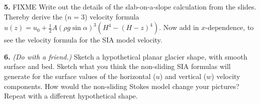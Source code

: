 \documentclass[12pt]{amsart}
\newcommand{\prob}[1]{\bigskip\noindent\textbf{#1.}\quad }
\begin{document}
\prob{5}  FIXME Write out the details of the slab-on-a-slope calculation from the slides.  Thereby derive the ($n=3$) velocity formula $u(z) = u_0 + \frac{1}{2} A (\rho g \sin\alpha)^3  \left(H^4 - (H-z)^4\right)$.  Now add in $x$-dependence, to see the velocity formula for the SIA model velocity.

\prob{6}  \emph{(Do with a friend.)}  Sketch a hypothetical planar glacier shape, with smooth surface and bed.  Sketch what you think the non-sliding SIA formulas will generate for the surface values of the horizontal ($u$) and vertical ($w$) velocity components.  How would the non-sliding Stokes model change your pictures?  Repeat with a different hypothetical shape.





\end{document}
